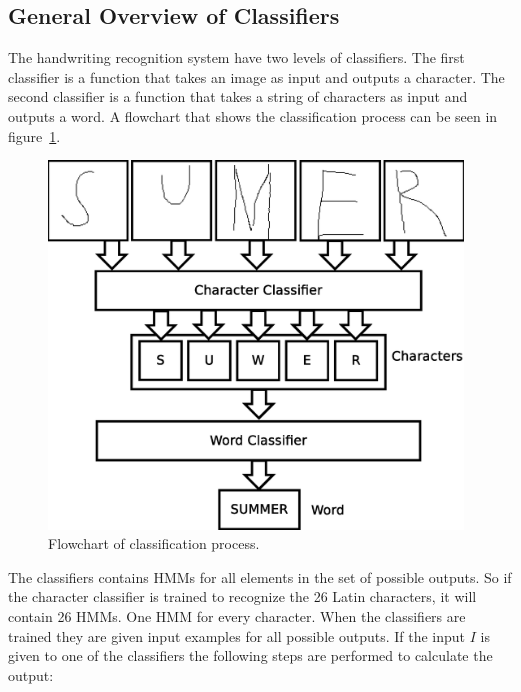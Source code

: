 \subsection{General Overview of Classifiers}
The handwriting recognition system have two levels of classifiers. The first classifier is a function that takes an image as input and outputs a character. The second classifier is a function that takes a string of characters as input and outputs a word. A flowchart that shows the classification process can be seen in figure~\ref{fig:classification_system_overview}. 

    \begin{figure}[htb] 
      \begin{center}
	\leavevmode
	\includegraphics[width=110mm]{classification_system_overview.eps}%
      \end{center}
      \caption{Flowchart of classification process.}
      \label{fig:classification_system_overview}
    \end{figure}

The classifiers contains HMMs for all elements in the set of possible outputs. So if the character classifier is trained to recognize the 26 Latin characters, it will contain 26 HMMs. One HMM for every character. When the classifiers are trained they are given input examples for all possible outputs. If the input $I$ is given to one of the classifiers the following steps are performed to calculate the output:

